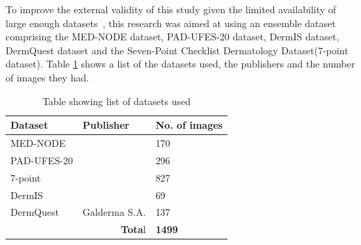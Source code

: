 \documentclass[12pt, a4paper]{article}
\begin{document}
To improve the external validity of this study given the limited availability of large enough datasets~\citep{yoon2019generalizable}, this research was aimed at using an ensemble dataset comprising the MED-NODE dataset, PAD-UFES-20 dataset, DermIS dataset, DermQuest dataset and the Seven-Point Checklist Dermatology Dataset(7-point dataset). Table \ref{tab:datasets} shows a list of the datasets used, the publishers and the number of images they had. 
    \begin{table}[h]
        \centering
        \begin{tabular}{|l|l|l|}
        \hline
        \textbf{Dataset} & \textbf{Publisher} & \textbf{No. of images}\\\hline
        MED-NODE & \cite{giotis2015med} & 170\\\hline
        PAD-UFES-20 & \cite{PACHECO2020103545} & 296\\\hline
        7-point & \cite{8333693} & 827\\\hline
        DermIS & \cite{dermis} & 69\\\hline
        DermQuest & Galderma S.A. & 137\\\hline
        \multicolumn{2}{|r|}{\textbf{Tota}l} & \textbf{1499}\\\hline
        \end{tabular}
        \caption{Table showing list of datasets used}
        \label{tab:datasets}
    \end{table}
\clearpage
\end{document}
